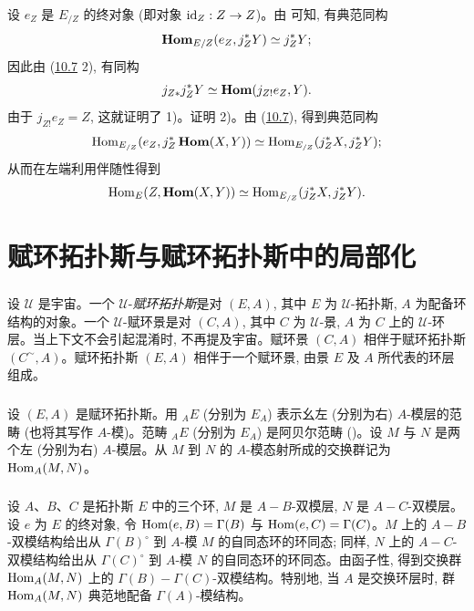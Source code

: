 设 $e_Z$ 是 $E_{/Z}$ 的终对象 (即对象 $\operatorname{id}_Z:Z\rightarrow Z$)。由  可知, 有典范同构
$$
\operatorname{\mathbf{Hom}}_{E/Z}(e_Z,j^{\ast}_ZY)\simeq j^{\ast}_ZY{};
$$
因此由 (\hyperref[IV.cor10.7]{10.7} 2), 有同构
$$
j_{Z\ast}j^{\ast}_ZY\simeq \operatorname{\mathbf{Hom}}(j_{Z!}e_Z,Y){.}
$$
由于 $j_{Z!}e_Z=Z$, 这就证明了 1)。证明 2)。由 (\hyperref[IV.cor10.7]{10.7}), 得到典范\pageoriginale 同构
$$
\operatorname{Hom}_{E_{/Z}}(e_Z,j^{\ast}_Z\operatorname{\mathbf{Hom}}(X,Y))\simeq
\operatorname{Hom}_{E_{/Z}}(j^{\ast}_ZX,j^{\ast}_ZY){};
$$
从而在左端利用伴随性得到
$$
\operatorname{Hom}_E(Z,\operatorname{\mathbf{Hom}}(X,Y))\simeq
\operatorname{Hom}_{E_{/Z}}(j^{\ast}_ZX,j^{\ast}_ZY){}.
$$


\section{赋环拓扑斯与赋环拓扑斯中的局部化}

\setcounter{subsection}{1} \setcounter{subsubsection}{0}
\subsubsection{}
设 $𝒰$ 是宇宙。一个 $𝒰$-\emph{赋环拓扑斯}是对 $(E,A)$, 其中 $E$ 为 $𝒰$-拓扑斯, $A$ 为配备环结构的对象。一个 $𝒰$-赋环景是对 $(C,A)$, 其中 $C$ 为 $𝒰$-景, $A$ 为 $C$ 上的 $𝒰$-环层。当上下文不会引起混淆时, 不再提及宇宙。赋环景 $(C,A)$ 相伴于赋环拓扑斯 $(C^{\sim},A)$。赋环拓扑斯 $(E,A)$ 相伴于一个赋环景, 由景 $E$ 及 $A$ 所代表的环层组成。

\subsubsection{}
设 $(E,A)$ 是赋环拓扑斯。用 ${}_AE$ (分别为 $E_A$) 表示幺左 (分别为右) $A$-模层的范畴 (也将其写作 $A$-模)。范畴 ${}_AE$ (分别为 $E_A$) 是阿贝尔范畴 ()。设 $M$ 与 $N$ 是两个左 (分别为右) $A$-模层。从 $M$ 到 $N$ 的 $A$-模态射所成的交换群记为 $\operatorname{Hom}_A(M,N)$。

\subsubsection{}
设 $A$、$B$、$C$ 是拓扑斯 $E$ 中的三个环, $M$ 是 $A-B$-双模层, $N$ 是 $A-C$-双模层。设 $e$ 为 $E$ 的终对象, 令 $\operatorname{Hom}(e,B)=\Gamma(B)$ 与 $\operatorname{Hom}(e,C)=\Gamma(C)$。$M$ 上的 $A-B$-双模结构给出从 $\Gamma(B)^{\circ}$ 到 $A$-模 $M$ 的自同态环的环同态; 同样, $N$ 上的 $A-C$-双模结构给出从 $\Gamma(C)^{\circ}$ 到 $A$-模 $N$ 的自同态环的环同态。由函子性, 得到交换群 $\operatorname{Hom}_A(M,N)$ 上的 $\Gamma(B)-\Gamma(C)$-双模结构。特别地, 当 $A$ 是交换环层时, 群 $\operatorname{Hom}_A(M,N)$ 典范地配备 $\Gamma(A)$-模结构。

